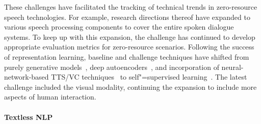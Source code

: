 These challenges have facilitated the tracking of technical trends in
zero-resource speech technologies.
For example, research directions thereof 
have expanded to various speech processing components to cover the entire
spoken dialogue systems.
To keep up with this expansion, the challenge has continued to develop
appropriate evaluation metrics for zero-resource scenarios.
Following the success of representation learning, baseline and challenge
techniques have shifted from purely generative 
models~\parencite{ondel_variational_2016,heck_feature_2017}, deep 
autoencoders~\parencite{tjandra_vqvae_2019,chorowski_unsupervised_2019}, and incorporation of
neural-network-based TTS/VC techniques~\parencite{vanniekerk_vectorquantized_2020} to
self"=supervised learning~\parencite{maekaku_speech_2021}.
The latest challenge included the visual modality, continuing the
expansion to include more aspects of human interaction.

\paragraph{Textless NLP}

